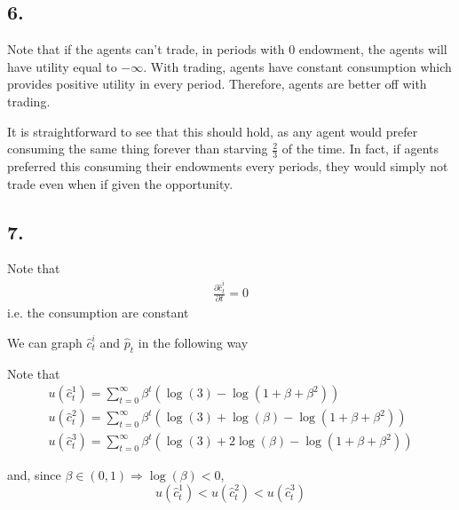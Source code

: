\documentclass[12pt]{article}
\theoremstyle{definition}
\begin{document}
\subsection*{6.}

Note that if the agents can't trade, in periods with $0$ endowment, the agents will have utility equal to $-\infty$. With trading, agents have constant consumption which provides positive utility in every period. Therefore, agents are better off with trading.

It is straightforward to see that this should hold, as any agent would prefer consuming the same thing forever than starving $\frac{2}{3}$ of the time. In fact, if agents preferred this consuming their endowments every periods, they would simply not trade even when if given the opportunity.

\subsection*{7.}

Note that
\begin{align}
	\frac{\partial \hat{c}_t^i}{\partial t}=0
\end{align}
i.e. the consumption are constant

We can graph $\hat{c}_t^i$ and $\hat{p}_t$ in the following way


Note that 
\begin{align*}
	u(\hat{c}_t^1) = \sum_{t=0}^{\infty}\beta^t (\log(3)-\log(1+\beta+\beta^2)) \\
	u(\hat{c}_t^2) = \sum_{t=0}^{\infty}\beta^t (\log(3)+\log(\beta)-\log(1+\beta+\beta^2))\\
	u(\hat{c}_t^3) = \sum_{t=0}^{\infty}\beta^t (\log(3)+2\log(\beta)-\log(1+\beta+\beta^2))
\end{align*}

and, since $\beta \in (0,1) \Rightarrow \log(\beta)<0$, 
\[
	u(\hat{c}_t^1)<u(\hat{c}_t^2)<u(\hat{c}_t^3)
\]
\end{document}
